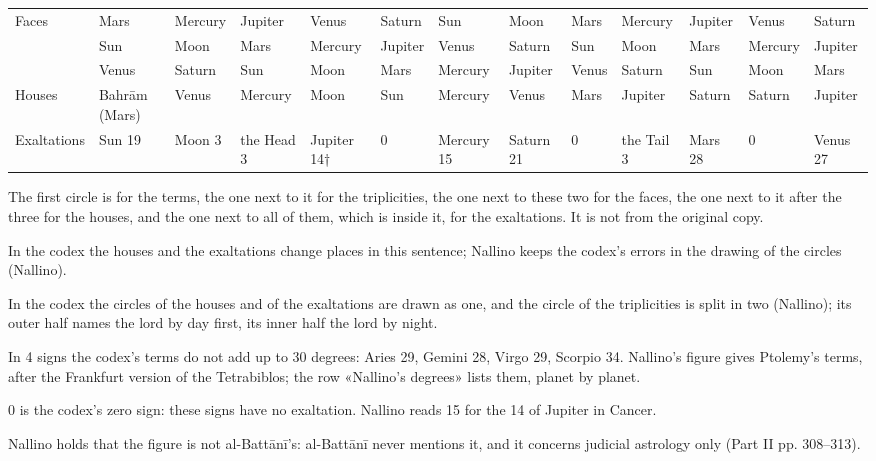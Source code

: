\begin{landscape}
{\begin{longtable}{L{30mm}L{15.5mm}L{15.5mm}L{15.5mm}L{15.5mm}L{15.5mm}L{15.5mm}L{15.5mm}L{15.5mm}L{15.5mm}L{15.5mm}L{15.5mm}L{15.5mm}}
Faces & Mars & Mercury & Jupiter & Venus & Saturn & Sun & Moon & Mars & Mercury & Jupiter & Venus & Saturn\\
 & Sun & Moon & Mars & Mercury & Jupiter & Venus & Saturn & Sun & Moon & Mars & Mercury & Jupiter\\
 & Venus & Saturn & Sun & Moon & Mars & Mercury & Jupiter & Venus & Saturn & Sun & Moon & Mars\\
Houses & Bahrām (Mars) & Venus & Mercury & Moon & Sun & Mercury & Venus & Mars & Jupiter & Saturn & Saturn & Jupiter\\
Exaltations & Sun 19 & Moon 3 & the Head 3 & Jupiter 14† & 0 & Mercury 15 & Saturn 21 & 0 & the Tail 3 & Mars 28 & 0 & Venus 27\\
\end{longtable}}
{\centering The first circle is for the terms, the one next to it for the triplicities, the one next to these two for the faces, the one next to it after the three for the houses, and the one next to all of them, which is inside it, for the exaltations. It is not from the original copy.\par}\smallskip
{\scriptsize In the codex the houses and the exaltations change places in this sentence; Nallino keeps the codex's errors in the drawing of the circles (Nallino).\par In the codex the circles of the houses and of the exaltations are drawn as one, and the circle of the triplicities is split in two (Nallino); its outer half names the lord by day first, its inner half the lord by night.\par In 4 signs the codex's terms do not add up to 30 degrees: Aries 29, Gemini 28, Virgo 29, Scorpio 34. Nallino's figure gives Ptolemy's terms, after the Frankfurt version of the Tetrabiblos; the row «Nallino's degrees» lists them, planet by planet.\par 0 is the codex's zero sign: these signs have no exaltation. Nallino reads 15 for the 14 of Jupiter in Cancer.\par Nallino holds that the figure is not al-Battānī's: al-Battānī never mentions it, and it concerns judicial astrology only (Part II pp. 308–313).\par}
\end{landscape}

\par{}\bigskip{}\nobreak\medskip

